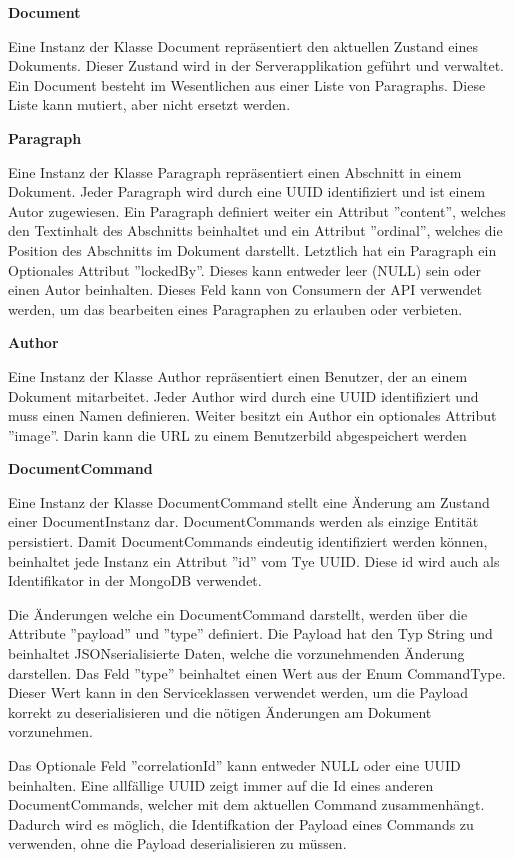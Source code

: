 \textbf{Document}

Eine Instanz der Klasse Document repräsentiert den aktuellen Zustand eines Dokuments.
Dieser Zustand wird in der Serverapplikation geführt und verwaltet.
Ein Document besteht im Wesentlichen aus einer Liste von Paragraphs.
Diese Liste kann mutiert, aber nicht ersetzt werden.

\textbf{Paragraph}

Eine Instanz der Klasse Paragraph repräsentiert einen Abschnitt in einem Dokument.
Jeder Paragraph wird durch eine UUID identifiziert und ist einem Autor zugewiesen.
Ein Paragraph definiert weiter ein Attribut ''content'',  welches den Textinhalt des Abschnitts beinhaltet und ein Attribut ''ordinal'', welches die Position des Abschnitts im Dokument darstellt.
Letztlich hat ein Paragraph ein Optionales Attribut ''lockedBy''.
Dieses kann entweder leer (NULL) sein oder einen Autor beinhalten.
Dieses Feld kann von Consumern der API verwendet werden, um das bearbeiten eines Paragraphen zu erlauben oder verbieten.

\textbf{Author}

Eine Instanz der Klasse Author repräsentiert einen Benutzer, der an einem Dokument mitarbeitet.
Jeder Author wird durch eine UUID identifiziert und muss einen Namen definieren.
Weiter besitzt ein Author ein optionales Attribut ''image''.
Darin kann die URL zu einem Benutzerbild abgespeichert werden

\clearpage

\textbf{DocumentCommand}

Eine Instanz der Klasse DocumentCommand stellt eine Änderung am Zustand einer Document\-Instanz dar.
DocumentCommands werden als einzige Entität persistiert.
Damit DocumentCommands eindeutig identifiziert werden können, beinhaltet jede Instanz ein Attribut ''id'' vom Tye UUID\@.
Diese id wird auch als Identifikator in der MongoDB verwendet.

Die Änderungen welche ein DocumentCommand darstellt, werden über die Attribute ''payload'' und ''type'' definiert.
Die Payload hat den Typ String und beinhaltet JSON\-serialisierte Daten, welche die vorzunehmenden Änderung darstellen.
Das Feld ''type'' beinhaltet einen Wert aus der Enum CommandType.
Dieser Wert kann in den Serviceklassen verwendet werden, um die Payload korrekt zu deserialisieren und die nötigen Änderungen am Dokument vorzunehmen.

Das Optionale Feld ''correlationId'' kann entweder NULL oder eine UUID beinhalten.
Eine allfällige UUID zeigt immer auf die Id eines anderen DocumentCommands, welcher mit dem aktuellen Command zusammenhängt.
Dadurch wird es möglich, die Identifkation der Payload eines Commands zu verwenden, ohne die Payload deserialisieren zu müssen.

